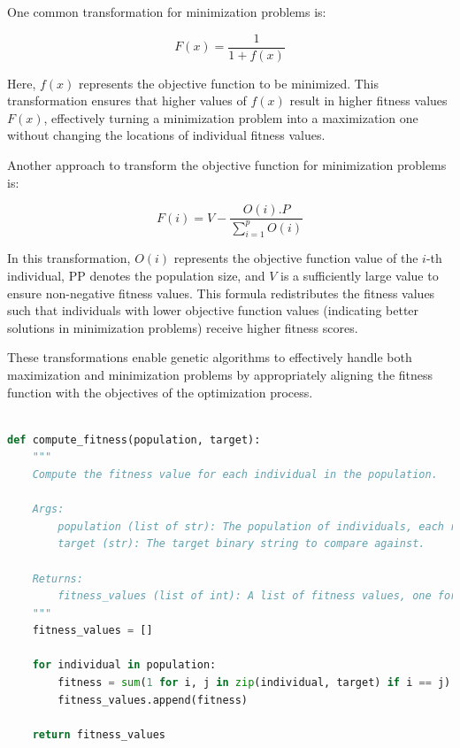 \documentclass[12pt]{article}
\begin{document}
One common transformation for minimization problems is:

$$F(x) = \frac{1}{1 + f(x)}$$

Here, $f(x)$ represents the objective function to be minimized. This transformation ensures that higher values of $f(x)$ result in higher fitness values $F(x)$, effectively turning a minimization problem into a maximization one without changing the locations of individual fitness values.


Another approach to transform the objective function for minimization problems is:

$$F(i) = V - \frac{O(i).P}{\sum_{i=1}^p O(i)}$$

In this transformation, $O(i)$ represents the objective function value of the $i$-th individual, PP denotes the population size, and $V$ is a sufficiently large value to ensure non-negative fitness values. This formula redistributes the fitness values such that individuals with lower objective function values (indicating better solutions in minimization problems) receive higher fitness scores.

These transformations enable genetic algorithms to effectively handle both maximization and minimization problems by appropriately aligning the fitness function with the objectives of the optimization process.\\[6px]


\begin{lstlisting}[language=Python, caption={Fitness Function}, numbers=none, breaklines=true]

def compute_fitness(population, target):
    """
    Compute the fitness value for each individual in the population.

    Args:
        population (list of str): The population of individuals, each represented as a binary string.
        target (str): The target binary string to compare against.

    Returns:
        fitness_values (list of int): A list of fitness values, one for each individual in the population.
    """
    fitness_values = []

    for individual in population:
        fitness = sum(1 for i, j in zip(individual, target) if i == j)
        fitness_values.append(fitness)

    return fitness_values
    
\end{lstlisting}
\end{document}
